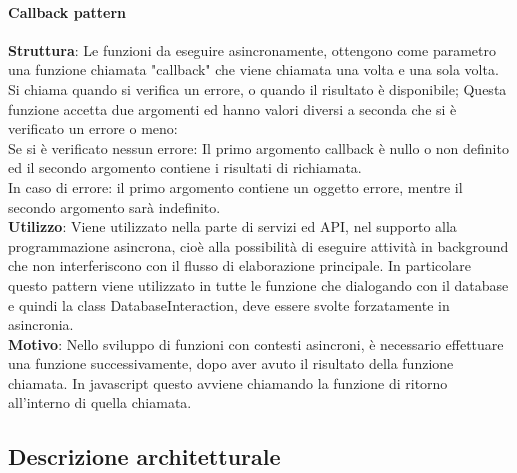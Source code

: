 \documentclass[../DefinizioneDiProdotto_v3.0.0.tex]{subfiles}
\begin{document}
\paragraph{Callback pattern}\mbox{}
\begin{addmargin}[1em]{2em}%
	\textbf{Struttura}: Le funzioni da eseguire asincronamente, ottengono come parametro una funzione chiamata "callback" che viene chiamata una volta e una sola volta. Si chiama quando si verifica un errore, o quando il risultato è disponibile; Questa funzione accetta due argomenti ed hanno valori diversi a seconda che si è verificato un errore o meno:\\
		Se si è verificato nessun errore:
		Il primo argomento callback è nullo o non definito ed il secondo argomento contiene i risultati di richiamata.\\
		In caso di errore:
		il primo argomento contiene un oggetto errore, mentre il secondo argomento sarà indefinito. \\
	\textbf{Utilizzo}: Viene utilizzato nella parte di servizi ed API, nel supporto alla programmazione asincrona, cioè alla possibilità di eseguire attività in background che non interferiscono con il flusso di elaborazione principale. In particolare questo pattern viene utilizzato in tutte le funzione che dialogando con il database e quindi la class DatabaseInteraction, deve essere svolte forzatamente in asincronia.\\
	\textbf{Motivo}: Nello sviluppo di funzioni con contesti asincroni, è  necessario effettuare una funzione successivamente, dopo aver avuto il risultato della funzione chiamata. In javascript questo avviene chiamando la funzione di ritorno all'interno di quella chiamata.\\
\end{addmargin}

\subsection{Descrizione architetturale}
\end{document}
